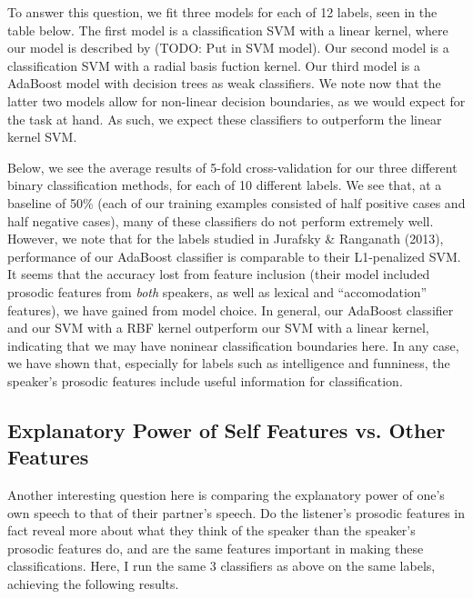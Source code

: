 \documentclass[11pt]{article}
\begin{document}
To answer this question, we fit three models for each of 12 labels, seen in the table below.  The first model is a classification SVM with a linear kernel, where our model is described by (TODO: Put in SVM model).  Our second model is a classification SVM with a radial basis fuction kernel.  Our third model is a AdaBoost model with decision trees as weak classifiers.  We note now that the latter two models allow for non-linear decision boundaries, as we would expect for the task at hand.  As such, we expect these classifiers to outperform the linear kernel SVM. 

Below, we see the average results of 5-fold cross-validation for our three different binary classification methods, for each of 10 different labels.  We see that, at a baseline of 50\% (each of our training examples consisted of half positive cases and half negative cases), many of these classifiers do not perform extremely well.  However, we note that for the labels studied in Jurafsky \& Ranganath (2013), performance of our AdaBoost classifier is comparable to their L1-penalized SVM.  It seems that the accuracy lost from feature inclusion (their model included prosodic features from \emph{both} speakers, as well as lexical and ``accomodation'' features), we have gained from model choice.  In general, our AdaBoost classifier and our SVM with a RBF kernel outperform our SVM with a linear kernel, indicating that we may have noninear classification boundaries here.  In any case, we have shown that, especially for labels such as intelligence and funniness, the speaker's prosodic features include useful information for classification.

\subsection{Explanatory Power of Self Features vs. Other Features}
Another interesting question here is comparing the explanatory power of one's own speech to that of their partner's speech.  Do the listener's prosodic features in fact reveal more about what they think of the speaker than the speaker's prosodic features do, and are the same features important in making these classifications.  Here, I run the same 3 classifiers as above on the same labels, achieving the following results. 
\end{document}
